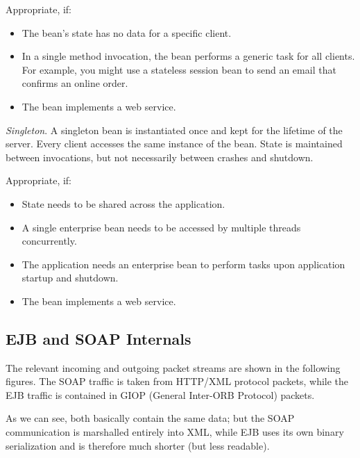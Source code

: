 \documentclass[a4paper,10pt]{article}
\begin{document}
Appropriate, if: 

\begin{itemize}
    \item The bean’s state has no data for a specific client.
    \item In a single method invocation, the bean performs a generic task for all clients. For example, you might use a stateless session bean to send an email that confirms an online order.
    \item The bean implements a web service.
\end{itemize}

\emph{Singleton}. A singleton bean is instantiated once and kept for the lifetime of the server.
Every client accesses the same instance of the bean. State is maintained between invocations,
but not necessarily between crashes and shutdown.

Appropriate, if: 

\begin{itemize}
    \item State needs to be shared across the application.
    \item A single enterprise bean needs to be accessed by multiple threads concurrently.
    \item The application needs an enterprise bean to perform tasks upon application startup and shutdown.
    \item The bean implements a web service.
\end{itemize}

\subsection{EJB and SOAP Internals}

The relevant incoming and outgoing packet streams are shown in the following figures.
The SOAP traffic is taken from HTTP/XML protocol packets, while the EJB traffic is contained
in GIOP (General Inter-ORB Protocol) packets.

As we can see, both basically contain the same data; but the SOAP communication
is marshalled entirely into XML, while EJB uses its own binary serialization and is therefore
much shorter (but less readable).
\end{document}
